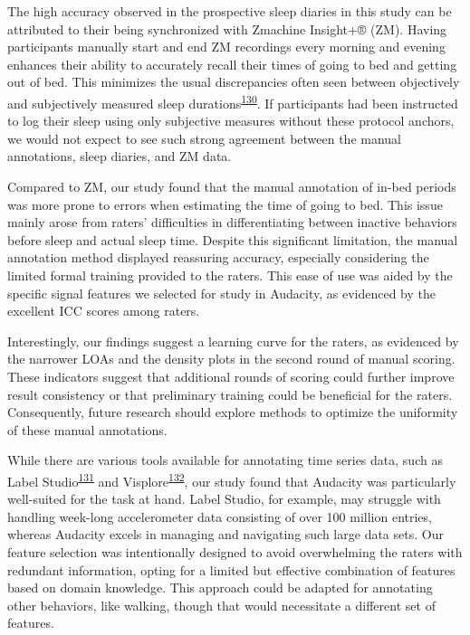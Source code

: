 \documentclass[
  10pt,
]{scrbook}
\begin{document}
The high accuracy observed in the prospective sleep diaries in this
study can be attributed to their being synchronized with Zmachine
Insight+® (ZM). Having participants manually start and end ZM recordings
every morning and evening enhances their ability to accurately recall
their times of going to bed and getting out of bed. This minimizes the
usual discrepancies often seen between objectively and subjectively
measured sleep
durations\textsuperscript{\protect\hyperlink{ref-aili_reliability_2017}{130}}.
If participants had been instructed to log their sleep using only
subjective measures without these protocol anchors, we would not expect
to see such strong agreement between the manual annotations, sleep
diaries, and ZM data.

Compared to ZM, our study found that the manual annotation of in-bed
periods was more prone to errors when estimating the time of going to
bed. This issue mainly arose from raters' difficulties in
differentiating between inactive behaviors before sleep and actual sleep
time. Despite this significant limitation, the manual annotation method
displayed reassuring accuracy, especially considering the limited formal
training provided to the raters. This ease of use was aided by the
specific signal features we selected for study in Audacity, as evidenced
by the excellent ICC scores among raters.

Interestingly, our findings suggest a learning curve for the raters, as
evidenced by the narrower LOAs and the density plots in the second round
of manual scoring. These indicators suggest that additional rounds of
scoring could further improve result consistency or that preliminary
training could be beneficial for the raters. Consequently, future
research should explore methods to optimize the uniformity of these
manual annotations.

While there are various tools available for annotating time series data,
such as Label
Studio\textsuperscript{\protect\hyperlink{ref-label_studio}{131}} and
Visplore\textsuperscript{\protect\hyperlink{ref-visplore}{132}}, our
study found that Audacity was particularly well-suited for the task at
hand. Label Studio, for example, may struggle with handling week-long
accelerometer data consisting of over 100 million entries, whereas
Audacity excels in managing and navigating such large data sets. Our
feature selection was intentionally designed to avoid overwhelming the
raters with redundant information, opting for a limited but effective
combination of features based on domain knowledge. This approach could
be adapted for annotating other behaviors, like walking, though that
would necessitate a different set of features.
\end{document}
